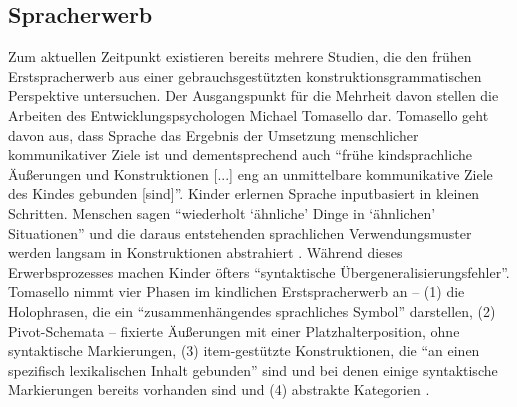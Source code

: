 


\subsection{Spracherwerb}
Zum aktuellen Zeitpunkt existieren bereits mehrere Studien, die den frühen Erstspracherwerb aus einer gebrauchsgestützten konstruktionsgrammatischen Perspektive untersuchen.
Der Ausgangspunkt für die Mehrheit davon stellen die Arbeiten des Entwicklungspsychologen Michael Tomasello dar.
Tomasello geht davon aus, dass Sprache das Ergebnis der Umsetzung menschlicher kommunikativer Ziele ist
und dementsprechend auch ``frühe kindsprachliche Äußerungen und Konstruktionen [...] eng an unmittelbare kommunikative Ziele des Kindes gebunden [sind]''\cite[vgl.][S.23]{Tomasello06}.
Kinder erlernen Sprache inputbasiert in kleinen Schritten.
Menschen sagen ``wiederholt `ähnliche' Dinge in `ähnlichen' Situationen'' \cite[S.21]{Tomasello06} und die daraus entstehenden sprachlichen Verwendungsmuster werden langsam in Konstruktionen abstrahiert \cite[vgl. auch][]{Ellis08}.
Während dieses Erwerbsprozesses machen Kinder öfters ``syntaktische Übergeneralisierungsfehler''.%
Tomasello nimmt vier Phasen im kindlichen Erstspracherwerb an --
(1) die Holophrasen, die ein ``zusammenhängendes sprachliches Symbol'' darstellen,
(2) Pivot-Schemata -- fixierte Äußerungen mit einer Platzhalterposition, ohne syntaktische Markierungen,
(3) item-gestützte Konstruktionen, die ``an einen spezifisch lexikalischen Inhalt gebunden'' sind und bei denen einige syntaktische Markierungen bereits vorhanden sind
und (4) abstrakte Kategorien \cite[vgl.][S.23-24]{Tomasello06}.



